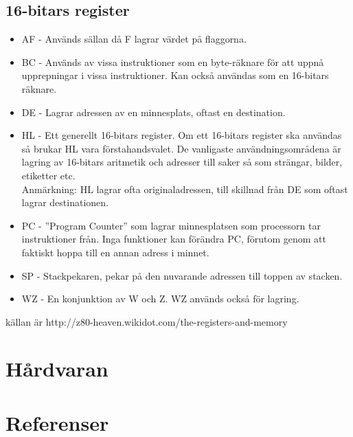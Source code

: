 \documentclass{article}
\begin{document}
\subsection{16-bitars register}
\begin{itemize}
    \item AF - Används sällan då F lagrar värdet på flaggorna.
    \item BC - Används av vissa instruktioner som en byte-räknare för att uppnå upprepningar i vissa instruktioner. Kan också användas som en 16-bitars räknare.
    \item DE - Lagrar adressen av en minnesplats, oftast en destination.
    \item HL - Ett generellt 16-bitars register. Om ett 16-bitars register ska användas så brukar HL vara förstahandsvalet. De vanligaste användningsområdena är lagring av 16-bitars aritmetik och adresser till saker så som strängar, bilder, etiketter etc.\\
    Anmärkning: HL lagrar ofta originaladressen, till skillnad från DE som oftast lagrar destinationen.
    \item PC - ''Program Counter'' som lagrar minnesplatsen som processorn tar instruktioner från. Inga funktioner kan förändra PC, förutom genom att faktiskt hoppa till en annan adress i minnet.
    \item SP - Stackpekaren, pekar på den nuvarande adressen till toppen av stacken.
    \item WZ - En konjunktion av W och Z. WZ används också för lagring.
\end{itemize}

\cite{z80heaven}
källan är http://z80-heaven.wikidot.com/the-registers-and-memory
\clearpage
\section{Hårdvaran}
\subsection{}

\section{Referenser}
\printbibliography
\end{document}
